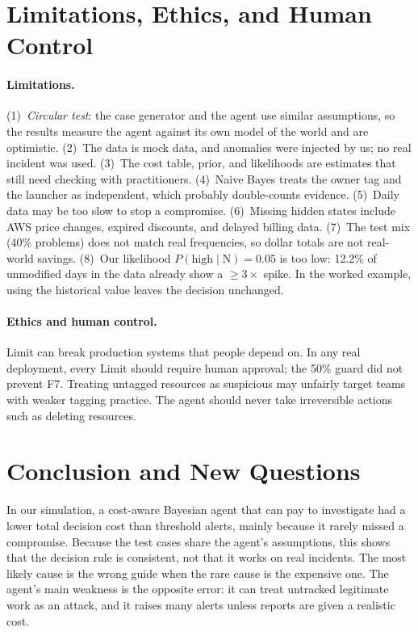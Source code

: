 \documentclass{article}
\begin{document}
\section{Limitations, Ethics, and Human Control}

\paragraph{Limitations.} (1)~\emph{Circular test}: the case generator and the agent use similar assumptions, so the results measure the agent against its own model of the world and are optimistic. (2)~The data is mock data, and anomalies were injected by us; no real incident was used. (3)~The cost table, prior, and likelihoods are estimates that still need checking with practitioners. (4)~Naive Bayes treats the owner tag and the launcher as independent, which probably double-counts evidence. (5)~Daily data may be too slow to stop a compromise. (6)~Missing hidden states include AWS price changes, expired discounts, and delayed billing data. (7)~The test mix (40\% problems) does not match real frequencies, so dollar totals are not real-world savings. (8)~Our likelihood $P(\text{high} \mid \mathrm{N}) = 0.05$ is too low: 12.2\% of unmodified days in the data already show a $\geq 3\times$ spike. In the worked example, using the historical value leaves the decision unchanged.

\paragraph{Ethics and human control.} Limit can break production systems that people depend on. In any real deployment, every Limit should require human approval; the 50\% guard did not prevent F7. Treating untagged resources as suspicious may unfairly target teams with weaker tagging practice. The agent should never take irreversible actions such as deleting resources.

\section{Conclusion and New Questions}

In our simulation, a cost-aware Bayesian agent that can pay to investigate had a lower total decision cost than threshold alerts, mainly because it rarely missed a compromise. Because the test cases share the agent's assumptions, this shows that the decision rule is consistent, not that it works on real incidents. The most likely cause is the wrong guide when the rare cause is the expensive one. The agent's main weakness is the opposite error: it can treat untracked legitimate work as an attack, and it raises many alerts unless reports are given a realistic cost.
\end{document}
